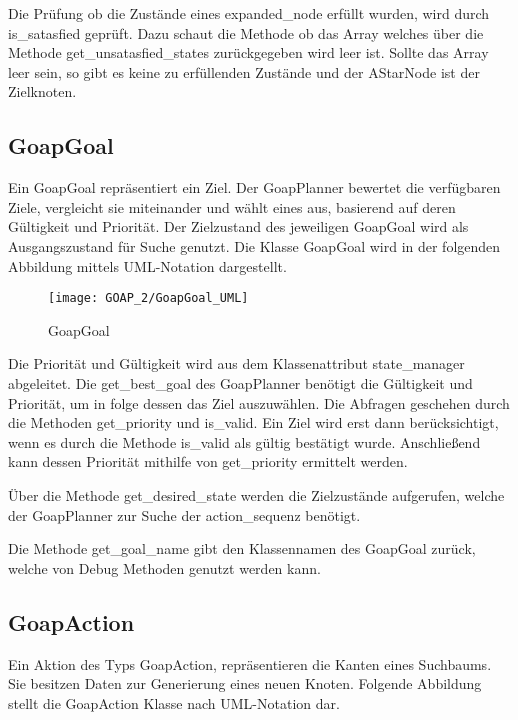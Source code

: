 Die Prüfung ob die Zustände eines expanded\_node erfüllt wurden, wird durch is\_satasfied geprüft. Dazu schaut die Methode ob das Array welches über die Methode get\_unsatasfied\_states zurückgegeben wird leer ist. Sollte das Array leer sein, so gibt es keine zu erfüllenden Zustände und der AStarNode ist der Zielknoten.


\subsection{GoapGoal}

Ein GoapGoal repräsentiert ein Ziel. Der GoapPlanner bewertet die verfügbaren Ziele, vergleicht sie miteinander und wählt eines aus, basierend auf deren Gültigkeit und Priorität. Der Zielzustand des jeweiligen GoapGoal wird als Ausgangszustand für Suche genutzt. Die Klasse GoapGoal wird in der folgenden Abbildung mittels UML-Notation dargestellt.

\begin{figure}[h]
  \centering
  \texttt{[image: GOAP\_2/GoapGoal\_UML]}
	\captionsetup{justification=justified, format=plain}
  \caption{GoapGoal}
  \label{GoapGoal}
\end{figure}

Die Priorität und Gültigkeit wird aus dem Klassenattribut state\_manager abgeleitet. Die get\_best\_goal des GoapPlanner benötigt die Gültigkeit und Priorität, um in folge dessen das Ziel auszuwählen. Die Abfragen geschehen durch die Methoden get\_priority und is\_valid. Ein Ziel wird erst dann berücksichtigt, wenn es durch die Methode is\_valid als gültig bestätigt wurde. Anschließend kann dessen Priorität mithilfe von get\_priority ermittelt werden. 

Über die Methode get\_desired\_state werden die Zielzustände aufgerufen, welche der GoapPlanner zur Suche der action\_sequenz benötigt. 

Die Methode get\_goal\_name gibt den Klassennamen des GoapGoal zurück, welche von Debug Methoden genutzt werden kann.


\subsection{GoapAction}

Ein Aktion des Typs GoapAction, repräsentieren die Kanten eines Suchbaums. Sie besitzen Daten zur Generierung eines neuen Knoten. Folgende Abbildung stellt die GoapAction Klasse nach UML-Notation dar.


